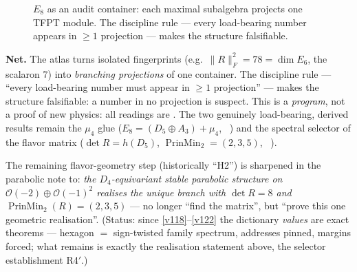 \documentclass[11pt,a4paper]{article}
\theoremstyle{definition}
\begin{document}
\begin{figure}[h]\centering
{}
\caption{\small $E_8$ as an audit container: each maximal subalgebra projects one TFPT module. The
discipline rule --- every load-bearing number appears in $\ge1$ projection --- makes the structure
falsifiable.}
\end{figure}

\par\smallskip\noindent\textbf{Net.}
The atlas turns isolated fingerprints (e.g.\ $\|R\|_F^2=78=\dim E_6$, the scalaron $7$) into
\emph{branching projections} of one container. The discipline rule --- ``every load-bearing number must
appear in $\ge1$ projection'' --- makes the structure falsifiable: a number in no projection is suspect.
This is a \emph{program}, not a proof of new physics: all readings are \mO. The two genuinely
load-bearing, derived results remain the $\mu_4$ glue ($E_8=(D_5\oplus A_3)+\mu_4$, \mE\ ) and the
spectral selector of the flavor matrix ($\det R=h(D_5)$, $\operatorname{PrinMin}_2=(2,3,5)$, \mE\ ).

\noindent The remaining flavor-geometry step (historically ``H2'') is sharpened in the parabolic note to:
\emph{the $D_4$-equivariant stable parabolic structure on $\mathcal O(-2)\oplus\mathcal O(-1)^2$ realises
the unique branch with $\det R=8$ and $\operatorname{PrinMin}_2(R)=(2,3,5)$} --- no longer ``find the
matrix'', but ``prove this one geometric realisation''. (Status: since \vref{v118}--\vref{v122} the dictionary
\emph{values} are exact theorems --- hexagon $=$ sign-twisted family spectrum, addresses pinned, margins
forced; what remains is exactly the realisation statement above, the selector establishment R4$'$.)
\end{document}
